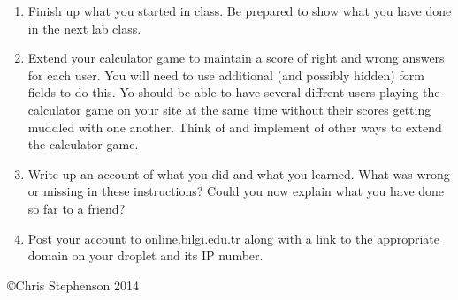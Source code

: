 \documentclass[12pt, a4paper]{article}
\begin{document}
\begin{enumerate}
\item Finish up what you started in class. Be prepared to show what you have done in the next lab class. 
\item Extend your calculator game to maintain a score of right and wrong answers for each user. You will need to use additional (and possibly hidden) form fields to do this. Yo should be able to have several diffrent users playing the calculator game on your site at the same time without their scores getting muddled with one another. Think of and implement of other ways to extend the calculator game. 
\item Write up an account of what you did and what you learned. What was wrong or missing in these instructions? Could you now explain what you have done so far to a friend?
\item Post your account to online.bilgi.edu.tr along with a link to the appropriate domain on your droplet and its IP number.

\end{enumerate}

\copyright Chris Stephenson 2014
\end{document}
